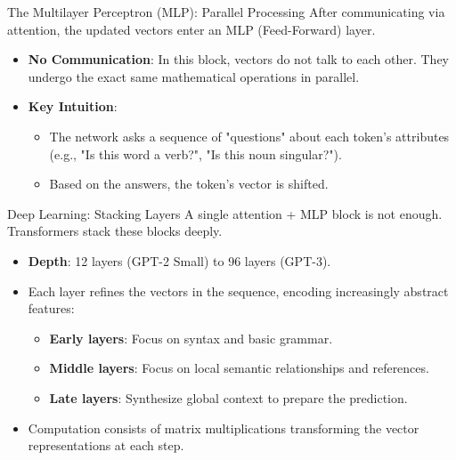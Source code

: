 \documentclass[aspectratio=169]{beamer}
\begin{document}
\begin{frame}{The Multilayer Perceptron (MLP): Parallel Processing}
  After communicating via attention, the updated vectors enter an MLP (Feed-Forward) layer.
  
  \begin{itemize}
    \item \textbf{No Communication}: In this block, vectors do not talk to each other. They undergo the exact same mathematical operations in parallel.
    \item \textbf{Key Intuition}: 
      \begin{itemize}
        \item The network asks a sequence of "questions" about each token's attributes (e.g., "Is this word a verb?", "Is this noun singular?").
        \item Based on the answers, the token's vector is shifted.
      \end{itemize}
  \end{itemize}
\end{frame}

\begin{frame}{Deep Learning: Stacking Layers}
  A single attention + MLP block is not enough. Transformers stack these blocks deeply.
  
  \begin{itemize}
    \item \textbf{Depth}: 12 layers (GPT-2 Small) to 96 layers (GPT-3).
    \item Each layer refines the vectors in the sequence, encoding increasingly abstract features:
      \begin{itemize}
        \item \textbf{Early layers}: Focus on syntax and basic grammar.
        \item \textbf{Middle layers}: Focus on local semantic relationships and references.
        \item \textbf{Late layers}: Synthesize global context to prepare the prediction.
      \end{itemize}
    \item Computation consists of matrix multiplications transforming the vector representations at each step.
  \end{itemize}
\end{frame}
\end{document}
